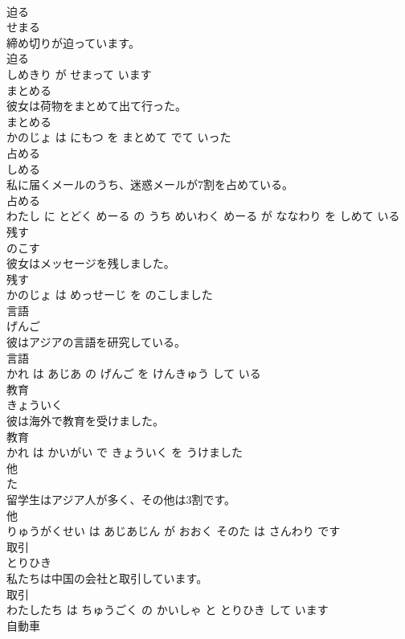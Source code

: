 \documentclass[8pt]{extreport}
\begin{document}
\begin{CJK}{UTF8}{min}
\\	迫る	
\\	せまる			
\\	締め切りが迫っています。	
\\	迫る 
\\	しめきり が せまって います			
\\	まとめる	
\\	彼女は荷物をまとめて出て行った。	
\\	まとめる 
\\	かのじょ は にもつ を まとめて でて いった			
\\	占める	
\\	しめる			
\\	私に届くメールのうち、迷惑メールが7割を占めている。	
\\	占める 
\\	わたし に とどく めーる の うち めいわく めーる が ななわり を しめて いる			
\\	残す	
\\	のこす			
\\	彼女はメッセージを残しました。	
\\	残す 
\\	かのじょ は めっせーじ を のこしました			
\\	言語	
\\	げんご			
\\	彼はアジアの言語を研究している。	
\\	言語 
\\	かれ は あじあ の げんご を けんきゅう して いる			
\\	教育	
\\	きょういく			
\\	彼は海外で教育を受けました。	
\\	教育 
\\	かれ は かいがい で きょういく を うけました			
\\	他	
\\	た			
\\	留学生はアジア人が多く、その他は3割です。	
\\	他 
\\	りゅうがくせい は あじあじん が おおく そのた は さんわり です			
\\	取引	
\\	とりひき			
\\	私たちは中国の会社と取引しています。	
\\	取引 
\\	わたしたち は ちゅうごく の かいしゃ と とりひき して います			
\\	自動車	

\end{CJK}
\end{document}
